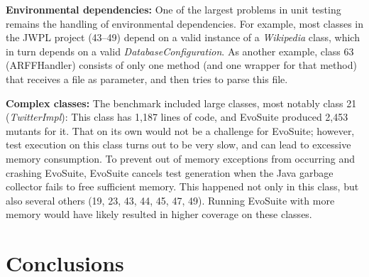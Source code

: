 \documentclass[runningheads,a4paper]{llncs}
\newcommand{\EVOSUITE}{{\sc EvoSuite}\xspace}
\begin{document}
{\bf Environmental dependencies: } One of the largest problems in unit
testing remains the handling of environmental dependencies. For
example, most classes in the JWPL project (43--49) depend on a valid
instance of a {\it Wikipedia} class, which in turn depends on a valid
{\it DatabaseConfiguration}. As another example, class 63
(ARFFHandler) consists of only one method (and one wrapper for that
method) that receives a file as parameter, and then tries to parse
this file.


{\bf Complex classes: } The benchmark included large classes, most
notably class 21 ({\it TwitterImpl}): This class has 1,187 lines of
code, and \EVOSUITE produced 2,453 mutants for it. That on its own
would not be a challenge for \EVOSUITE; however, test execution on
this class turns out to be very slow, and can lead to excessive memory
consumption. To prevent out of memory exceptions from occurring and
crashing \EVOSUITE, \EVOSUITE cancels test generation when the Java
garbage collector fails to free sufficient memory. This happened not
only in this class, but also several others (19, 23, 43, 44, 45, 47,
49). Running \EVOSUITE with more memory would have likely resulted in
higher coverage on these classes.












\section{Conclusions}
\end{document}
